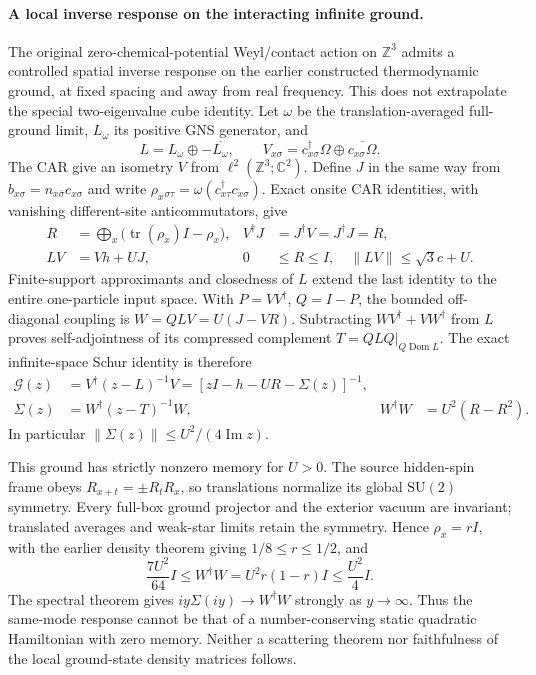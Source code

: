 \paragraph{A local inverse response on the interacting infinite ground.}
The original zero-chemical-potential Weyl/contact action on $\mathbb Z^3$
admits a controlled spatial inverse response on the earlier
constructed thermodynamic ground, at fixed spacing and away from real
frequency.  This does not extrapolate the special two-eigenvalue cube
identity.  Let $\omega$ be the translation-averaged full-ground limit,
$L_\omega$ its positive GNS generator, and
\[
L=L_\omega\oplus-\overline{L_\omega},\qquad
V_{x\sigma}=c_{x\sigma}^\dagger\Omega
                 \oplus\overline{c_{x\sigma}\Omega}.
\]
The CAR give an isometry $V$ from
$\ell^2(\mathbb Z^3;\mathbb C^2)$.  Define $J$ in the same way from
$b_{x\sigma}=n_{x\bar\sigma}c_{x\sigma}$ and write
$\rho_x{}_{\sigma\tau}=\omega(c_{x\tau}^\dagger c_{x\sigma})$.
Exact onsite CAR identities, with vanishing different-site
anticommutators, give
\begin{align*}
R&=\bigoplus_x\bigl(\operatorname{tr}(\rho_x)I-\rho_x\bigr),
 &V^\dagger J&=J^\dagger V=J^\dagger J=R,\\
LV&=Vh+UJ,
 &0&\leq R\leq I,\quad \|LV\|\leq\sqrt3c+U.
\end{align*}
Finite-support approximants and closedness of $L$ extend the last
identity to the entire one-particle input space.  With $P=VV^\dagger$,
$Q=I-P$, the bounded off-diagonal coupling is $W=QLV=U(J-VR)$.
Subtracting $WV^\dagger+VW^\dagger$ from $L$ proves self-adjointness
of its compressed complement $T=QLQ|_{Q\operatorname{Dom}L}$.
The exact infinite-space Schur identity is therefore
\begin{align*}
\mathcal G(z)&=V^\dagger(z-L)^{-1}V
          =[zI-h-UR-\Sigma(z)]^{-1},\\
\Sigma(z)&=W^\dagger(z-T)^{-1}W,
 &W^\dagger W&=U^2(R-R^2).
\end{align*}
In particular $\|\Sigma(z)\|\leq U^2/(4\operatorname{Im}z)$.

This ground has strictly nonzero memory for $U>0$.  The source hidden-spin
frame obeys $R_{x+t}=\pm R_tR_x$, so translations normalize its global
$\mathrm{SU}(2)$ symmetry.  Every full-box ground projector and the
exterior vacuum are invariant; translated averages and weak-star limits
retain the symmetry.  Hence $\rho_x=rI$, with the earlier density theorem
giving $1/8\leq r\leq1/2$, and
\[
 \frac{7U^2}{64}I\leq W^\dagger W
       =U^2r(1-r)I\leq\frac{U^2}{4}I.
\]
The spectral theorem gives $iy\Sigma(iy)\to W^\dagger W$ strongly as
$y\to\infty$.  Thus the same-mode response cannot be that of a
number-conserving static quadratic Hamiltonian with zero memory.
Neither a scattering theorem
nor faithfulness of the local ground-state density matrices follows.

